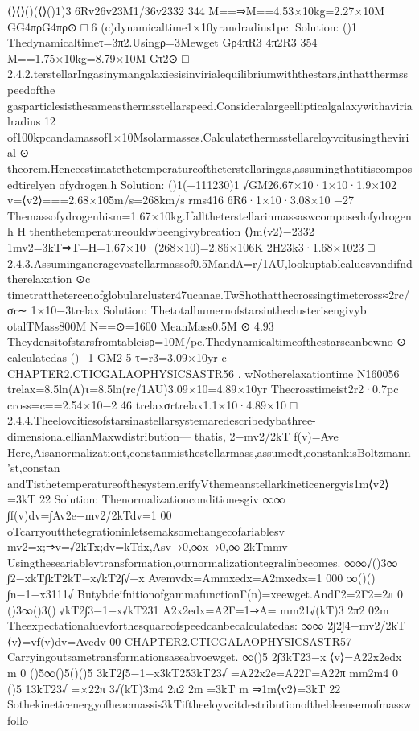 ⟨⟩⟨⟩()(⟨⟩()1)3
6Rv26v23M1/36v2332
344
M==⇒M==4.53×10kg=2.27×10M
GG4πρG4πρ⊙
□
6
(c)dynamicaltime1×10yrandradius1pc.
Solution:
()1
Thedynamicaltimeτ=3π2.Usingρ=3Mewget
Gρ4πR3
4π2R3
354
M==1.75×10kg=8.79×10M
Gτ2⊙
□
2.4.2.terstellarIngasinymangalaxiesisinvirialequilibriumwiththestars,inthatthermsspeedofthe
gasparticlesisthesameasthermsstellarspeed.Consideralargeellipticalgalaxywithavirialradius
12
of100kpcandamassof1×10Msolarmasses.Calculatethermsstellareloyvcitusingthevirial
⊙
theorem.Henceestimatethetemperatureoftheterstellaringas,assumingthatitiscomposedtirelyen
ofydrogen.h
Solution:
()1(−111230)1
√GM26.67×10·1×10·1.9×102
v=⟨v2⟩===2.68×105m/s=268km/s
rms416
6R6·1×10·3.08×10
−27
Themassofydrogenhism=1.67×10kg.Ifalltheterstellarinmassaswcomposedofydrogenh
H
thenthetemperatureouldwbeengivybreation
⟨⟩m⟨v2⟩−2332
1mv2=3kT⇒T=H=1.67×10·(268×10)=2.86×106K
2H23k3·1.68×1023
□
2.4.3.Assuminganeragevastellarmassof0.5MandΛ=r/1AU,lookuptablealuesvandifndtherelaxation
⊙c
timetratthetercenofglobularcluster47ucanae.TwShothatthecrossingtimetcross≈2rc/σr∼
1×10−3trelax
Solution:
Thetotalbumernofstarsintheclusterisengivyb
otalTMass800M
N==⊙=1600
MeanMass0.5M
⊙
4.93
Theydensitofstarsfromtableisρ=10M/pc.Thedynamicaltimeofthestarscanbewno
⊙
calculatedas
()−1
GM2
5
τ=r3=3.09×10yr
c
CHAPTER2.CTICGALAOPHYSICSASTR56
.
wNotherelaxationtime
N160056
trelax=8.5ln(Λ)τ=8.5ln(rc/1AU)3.09×10=4.89×10yr
Thecrosstimeist2r2·0.7pc
cross=c==2.54×10−2
46
trelaxσrtrelax1.1×10·4.89×10
□
2.4.4.Theelovcitiesofstarsinastellarsystemaredescribedybathree-dimensionalellianMaxwdistribution—
thatis,
2−mv2/2kT
f(v)=Ave
Here,Aisanormalizationt,constanmisthestellarmass,assumedt,constankisBoltzmann’st,constan
andTisthetemperatureofthesystem.erifyVthemeanstellarkineticenergyis1m⟨v2⟩=3kT
22
Solution:
Thenormalizationconditionesgiv
∞∞
∫f(v)dv=∫Av2e−mv2/2kTdv=1
00
oTcarryoutthetegrationinletsemaksomehangecofariablesv
mv2=x;⇒v=√2kTx;dv=kTdx,Asv→{0,∞}x→{0,∞}
2kTmmv
Usingtheseariablevtransformation,ournormalizationtegralinbecomes.
∞∞√()3∞
∫2−xkT∫kT2kT−x√kT2∫√−x
Avemvdx=Ammxedx=A2mxedx=1
000
∞()()
∫n−1−x3111√
ButybdeifnitionofgammafunctionΓ(n)=xeewget.AndΓ2=2Γ2=2π
0
()3∞()3()
√kT2∫3−1−x√kT231
A2x2edx=A2Γ=1⇒A=
mm21√(kT)3
2π2
02m
Theexpectationaluevforthesquareofspeedcanbecalculatedas:
∞∞
2∫2∫4−mv2/2kT
⟨v⟩=vf(v)dv=Avedv
00
CHAPTER2.CTICGALAOPHYSICSASTR57
Carryingoutsametransformationsaseabvoewget.
∞()5
2∫3kT23−x
⟨v⟩=A22x2edx
m
0
()5∞()5()()5
3kT2∫5−1−x3kT253kT23√
=A22x2e=A22Γ=A22π
mm2m4
0
()5
13kT23√
=×22π
3√(kT)3m4
2π2
2m
=3kT
m
⇒1m⟨v2⟩=3kT
22
Sothekineticenergyofheacmassis3kTiftheeloyvcitdestributionofthebleensemofmasswfollo
